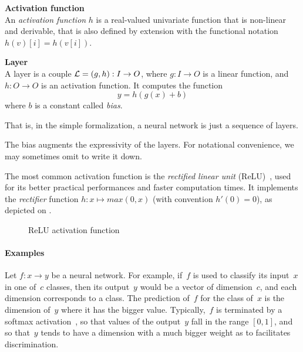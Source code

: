 \begin{definition}\textbf{Activation function}\\
An \emph{activation function} $h$ is a real-valued univariate function that is non-linear and derivable, that is also defined by extension with the functional notation $h(v)[i] = h(v[i])$.
\end{definition}

\begin{definition}\textbf{Layer}\\
A layer is a couple $\mathcal{L} = (g,h) : I \to O$, where $g : I \to O$ is a linear function, and $h: O \to O$ is an activation function. It computes the function
$$
y = h(g(x) + b)
$$
where $b$ is a constant called \emph{bias}.
\end{definition}

That is, in the simple formalization, a neural network is just a sequence of layers.

\begin{remark}The bias augments the expressivity of the layers. For notational convenience, we may sometimes omit to write it down.
\end{remark}

The most common activation function is the \emph{rectified linear unit} (ReLU)~\citep{glorot2011deep}, used for its better practical performances and faster computation times. It implements the \emph{rectifier} function $h: x \mapsto max(0,x)$ (with convention $h'(0) = 0$), as depicted on .

 \begin{figure}[htbp]
 \centering
 \caption{ReLU activation function}
 \label{fig:relu}
 \end{figure}

\paragraph{Examples}
Let $f: x \to y$ be a neural network. For example, if~$f$ is used to classify its input~$x$ in one of~$c$ classes, then its output~$y$ would be a vector of dimension~$c$,  and each dimension corresponds to a class. The prediction of~$f$ for the class of~$x$ is the dimension of~$y$ where it has the bigger value. Typically,~$f$ is terminated by a softmax activation~\citep{wiki:soft}, so that values of the output~$y$ fall in the range $[0,1]$, and so that~$y$ tends to have a dimension with a much bigger weight as to facilitates discrimination.

